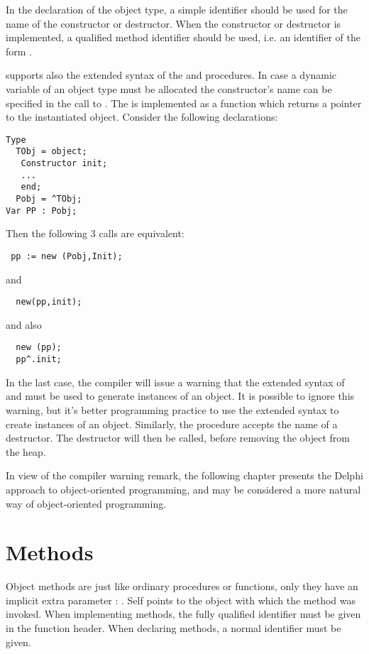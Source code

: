In the declaration of the object type, a simple identifier should be used
for the name of the constructor or destructor. When the constructor or destructor
is implemented, a qualified method identifier should be used,
i.e. an identifier of the form .

\fpc supports also the extended syntax of the  and 
procedures. In case a dynamic variable of an object type must be allocated
the constructor's name can be specified in the call to .
The  is implemented as a function which returns a pointer to the
instantiated object. Consider the following declarations:
\begin{verbatim}
Type
  TObj = object;
   Constructor init;
   ...
   end;
  Pobj = ^TObj;
Var PP : Pobj;
\end{verbatim}
Then the following 3 calls are equivalent:
\begin{verbatim}
 pp := new (Pobj,Init);
\end{verbatim}
and
\begin{verbatim}
  new(pp,init);
\end{verbatim}
and also
\begin{verbatim}
  new (pp);
  pp^.init;
\end{verbatim}
In the last case, the compiler will issue a warning that the
extended syntax of  and  must be used to generate instances of an
object. It is possible to ignore this warning, but it's better programming practice to
use the extended syntax to create instances of an object.
Similarly, the  procedure accepts the name of a destructor. The
destructor will then be called, before removing the object from the heap.

In view of the compiler warning remark, the following chapter presents the
Delphi approach to object-oriented programming, and may be considered a
more natural way of object-oriented programming.

\section{Methods}
Object methods are just like ordinary procedures or functions, only they
have an implicit extra parameter : . Self points to the object
with which the method was invoked.
When implementing methods, the fully qualified identifier must be given
in the function header. When declaring methods, a normal identifier must be
given.

